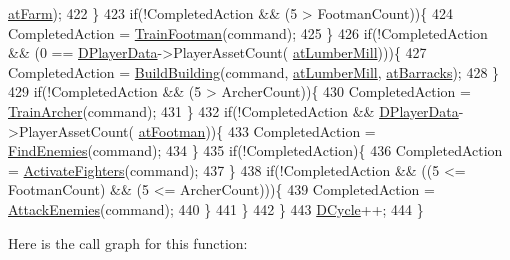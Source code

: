 \begin{DoxyCode}
      \hyperlink{GameDataTypes_8h_a5600d4fc433b83300308921974477feca406eab24dcbad1858522aca11b1088f5}{atFarm});
422             \}
423             \textcolor{keywordflow}{if}(!CompletedAction && (5 > FootmanCount))\{
424                 CompletedAction = \hyperlink{classCAIPlayer_aa3f9c1d0d449a45a24e065d2086527b0}{TrainFootman}(command);
425             \}
426             \textcolor{keywordflow}{if}(!CompletedAction && (0 == \hyperlink{classCAIPlayer_a83b5113c8f7e80df54940b647c5ee2e6}{DPlayerData}->PlayerAssetCount(
      \hyperlink{GameDataTypes_8h_a5600d4fc433b83300308921974477feca7bb38316bc3193b5c9ec67ea6aad549c}{atLumberMill})))\{
427                 CompletedAction = \hyperlink{classCAIPlayer_a2ff5263cbaa6bfc62ffec4dbce87ba88}{BuildBuilding}(command, 
      \hyperlink{GameDataTypes_8h_a5600d4fc433b83300308921974477feca7bb38316bc3193b5c9ec67ea6aad549c}{atLumberMill}, \hyperlink{GameDataTypes_8h_a5600d4fc433b83300308921974477feca1cbf6c944f30d615a247eef1f57b2230}{atBarracks});
428             \}
429             \textcolor{keywordflow}{if}(!CompletedAction &&  (5 > ArcherCount))\{
430                 CompletedAction = \hyperlink{classCAIPlayer_af2edf1e3c54d6af693f768f86d484fd6}{TrainArcher}(command);
431             \}
432             \textcolor{keywordflow}{if}(!CompletedAction && \hyperlink{classCAIPlayer_a83b5113c8f7e80df54940b647c5ee2e6}{DPlayerData}->PlayerAssetCount(
      \hyperlink{GameDataTypes_8h_a5600d4fc433b83300308921974477fecad586e8ff9ee846d22630c2066e8fb7c2}{atFootman}))\{
433                 CompletedAction = \hyperlink{classCAIPlayer_a33b1533570e7a00114d1b85b3551e395}{FindEnemies}(command);
434             \}
435             \textcolor{keywordflow}{if}(!CompletedAction)\{
436                 CompletedAction = \hyperlink{classCAIPlayer_a4216d7e76315234a4fe22fb3a0a89c1d}{ActivateFighters}(command);
437             \}
438             \textcolor{keywordflow}{if}(!CompletedAction && ((5 <= FootmanCount) && (5 <= ArcherCount)))\{
439                 CompletedAction = \hyperlink{classCAIPlayer_adf7feeba7debf9f19b000887616d7bfb}{AttackEnemies}(command);
440             \}
441         \}
442     \}
443     \hyperlink{classCAIPlayer_adf12a7afe7ea86410b18eff47fa95253}{DCycle}++;
444 \}
\end{DoxyCode}
Here is the call graph for this function\+:\nopagebreak
